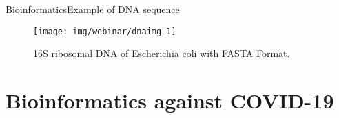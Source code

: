 \documentclass[10pt]{beamer}
\newcommand{\1}{
        	\setbeamertemplate{background}{
        		\texttt{[image: img/1]}
        		\tikz[overlay] \fill[fill opacity=0.75,fill=white] (0,0) rectangle (-\paperwidth,\paperheight);
        	}
}
\begin{document}
\begin{frame}{Bioinformatics}{Example of DNA sequence}
	\begin{figure}[]
		\centering
		\texttt{[image: img/webinar/dnaimg\_1]}
		\label{img:mot2}
		\caption{16S ribosomal DNA of Escherichia coli with FASTA Format.}
	\end{figure}
\end{frame}


\section{Bioinformatics against COVID-19}




\end{document}

